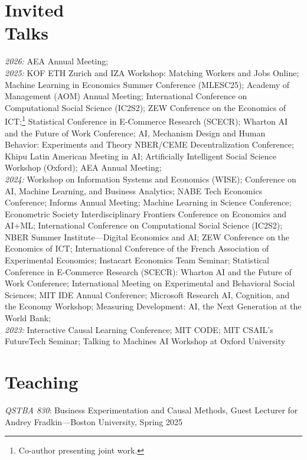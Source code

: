 \documentclass[margin,line,pifont,palatino,courier, 9pt]{res}
\begin{document}
\begin{resume}
\section{\sc Invited\\Talks\footnotemark}
\textit{2026:} 
AEA Annual Meeting;\vspace{2mm}\\
\textit{2025:} 
KOF ETH Zurich and IZA Workshop: Matching Workers and Jobs Online;
Machine Learning in Economics Summer Conference (MLESC25);
Academy of Management (AOM) Annual Meeting;
International Conference on Computational Social Science (IC2S2);
ZEW Conference on the Economics of ICT;\footnote{Co-author presenting joint work.}
Statistical Conference in E-Commerce Research (SCECR)\footnotemark[\value{footnote}];
Wharton AI and the Future of Work Conference;
AI, Mechanism Design and Human Behavior: Experiments and Theory NBER/CEME Decentralization Conference;
Khipu Latin American Meeting in AI;
Artificially Intelligent Social Science Workshop (Oxford);
AEA Annual Meeting;\vspace{2mm}\\
\textit{2024:} Workshop on Information Systems and Economics (WISE)\footnotemark[\value{footnote}];
Conference on AI, Machine Learning, and Business Analytics;
NABE Tech Economics Conference; 
Informs Annual Meeting\footnotemark[\value{footnote}];
Machine Learning in Science Conference;
Econometric Society Interdisciplinary Frontiers Conference on Economics and AI+ML; 
International Conference on Computational Social Science (IC2S2)\footnotemark[\value{footnote}];
NBER Summer Institute---Digital Economics and AI\footnotemark[\value{footnote}];
ZEW Conference on the Economics of ICT;
International Conference of the French Association of Experimental Economics;
Instacart Economics Team Seminar;
Statistical Conference in E-Commerce Research (SCECR):
Wharton AI and the Future of Work Conference; 
International Meeting on Experimental and Behavioral Social Sciences;
MIT IDE Annual Conference; 
Microsoft Research AI, Cognition, and the Economy Workshop; 
Measuring Development: AI, the Next Generation at the World Bank; 
\vspace{2mm}\\
\textit{2023:} Interactive Causal Learning Conference; 
MIT CODE; 
MIT CSAIL's FutureTech Seminar;
Talking to Machines AI Workshop at Oxford University

\section{\sc Teaching}
\textit{QSTBA 830}: Business Experimentation and Causal Methods, Guest Lecturer for Andrey Fradkin---Boston University, Spring 2025


\end{resume}
\end{document}
